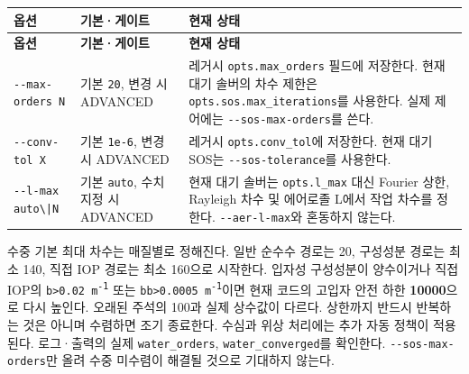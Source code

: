 {\TableFont
\begin{longtable}{@{}>{\raggedright\arraybackslash}p{}>{\raggedright\arraybackslash}p{}>{\raggedright\arraybackslash}p{}@{}}
\toprule
\textbf{옵션} & \textbf{기본·게이트} & \textbf{현재 상태} \\
\midrule
\endfirsthead
\toprule
\textbf{옵션} & \textbf{기본·게이트} & \textbf{현재 상태} \\
\midrule
\endhead
\bottomrule
\endfoot
\texttt{-\allowbreak{}-\allowbreak{}max-\allowbreak{}orders N} & 기본 \texttt{20}, 변경 시 ADVANCED & 레거시 \texttt{opts.\allowbreak{}max\_\allowbreak{}orders} 필드에 저장한다. 현재 대기 솔버의 차수 제한은 \texttt{opts.\allowbreak{}sos.\allowbreak{}max\_\allowbreak{}iterations}를 사용한다. 실제 제어에는 \texttt{-\allowbreak{}-\allowbreak{}sos-\allowbreak{}max-\allowbreak{}orders}를 쓴다. \\
\texttt{-\allowbreak{}-\allowbreak{}conv-\allowbreak{}tol X} & 기본 \texttt{1e-\allowbreak{}6}, 변경 시 ADVANCED & 레거시 \texttt{opts.\allowbreak{}conv\_\allowbreak{}tol}에 저장한다. 현재 대기 SOS는 \texttt{-\allowbreak{}-\allowbreak{}sos-\allowbreak{}tolerance}를 사용한다. \\
\texttt{-\allowbreak{}-\allowbreak{}l-\allowbreak{}max auto\textbackslash{}|N} & 기본 \texttt{auto}, 수치 지정 시 ADVANCED & 현재 대기 솔버는 \texttt{opts.\allowbreak{}l\_\allowbreak{}max} 대신 Fourier 상한, Rayleigh 차수 및 에어로졸 L에서 작업 차수를 정한다. \texttt{-\allowbreak{}-\allowbreak{}aer-\allowbreak{}l-\allowbreak{}max}와 혼동하지 않는다. \\
\end{longtable}
}

수중 기본 최대 차수는 매질별로 정해진다. 일반 순수수 경로는 20, 구성성분 경로는 최소 140, 직접 IOP 경로는 최소 160으로 시작한다. 입자성 구성성분이 양수이거나 직접 IOP의 \texttt{b>0.\allowbreak{}02 m\textsuperscript{-}\textsuperscript{1}} 또는 \texttt{bb>0.\allowbreak{}0005 m\textsuperscript{-}\textsuperscript{1}}이면 현재 코드의 고입자 안전 하한 \textbf{10000}으로 다시 높인다. 오래된 주석의 100과 실제 상수값이 다르다. 상한까지 반드시 반복하는 것은 아니며 수렴하면 조기 종료한다. 수심과 위상 처리에는 추가 자동 정책이 적용된다. 로그·출력의 실제 \texttt{water\_\allowbreak{}orders}, \texttt{water\_\allowbreak{}converged}를 확인한다. \texttt{-\allowbreak{}-\allowbreak{}sos-\allowbreak{}max-\allowbreak{}orders}만 올려 수중 미수렴이 해결될 것으로 기대하지 않는다.

